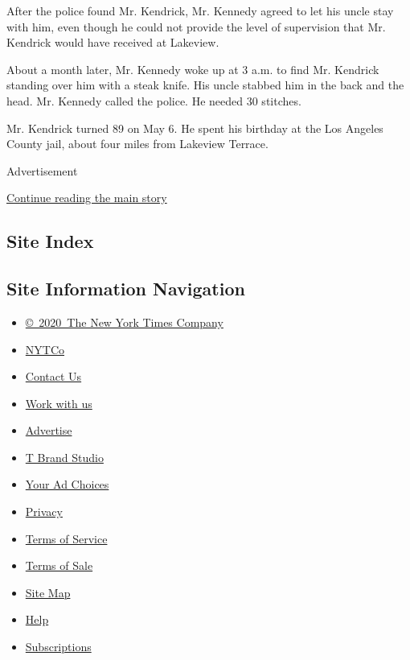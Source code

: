 After the police found Mr. Kendrick, Mr. Kennedy agreed to let his uncle
stay with him, even though he could not provide the level of supervision
that Mr. Kendrick would have received at Lakeview.

About a month later, Mr. Kennedy woke up at 3 a.m. to find Mr. Kendrick
standing over him with a steak knife. His uncle stabbed him in the back
and the head. Mr. Kennedy called the police. He needed 30 stitches.

Mr. Kendrick turned 89 on May 6. He spent his birthday at the Los
Angeles County jail, about four miles from Lakeview Terrace.

Advertisement

\protect\hyperlink{after-bottom}{Continue reading the main story}

\hypertarget{site-index}{%
\subsection{Site Index}\label{site-index}}

\hypertarget{site-information-navigation}{%
\subsection{Site Information
Navigation}\label{site-information-navigation}}

\begin{itemize}
\tightlist
\item
  \href{https://help.nytimes3xbfgragh.onion/hc/en-us/articles/115014792127-Copyright-notice}{©~2020~The
  New York Times Company}
\end{itemize}

\begin{itemize}
\tightlist
\item
  \href{https://www.nytco.com/}{NYTCo}
\item
  \href{https://help.nytimes3xbfgragh.onion/hc/en-us/articles/115015385887-Contact-Us}{Contact
  Us}
\item
  \href{https://www.nytco.com/careers/}{Work with us}
\item
  \href{https://nytmediakit.com/}{Advertise}
\item
  \href{http://www.tbrandstudio.com/}{T Brand Studio}
\item
  \href{https://www.nytimes3xbfgragh.onion/privacy/cookie-policy\#how-do-i-manage-trackers}{Your
  Ad Choices}
\item
  \href{https://www.nytimes3xbfgragh.onion/privacy}{Privacy}
\item
  \href{https://help.nytimes3xbfgragh.onion/hc/en-us/articles/115014893428-Terms-of-service}{Terms
  of Service}
\item
  \href{https://help.nytimes3xbfgragh.onion/hc/en-us/articles/115014893968-Terms-of-sale}{Terms
  of Sale}
\item
  \href{https://spiderbites.nytimes3xbfgragh.onion}{Site Map}
\item
  \href{https://help.nytimes3xbfgragh.onion/hc/en-us}{Help}
\item
  \href{https://www.nytimes3xbfgragh.onion/subscription?campaignId=37WXW}{Subscriptions}
\end{itemize}
